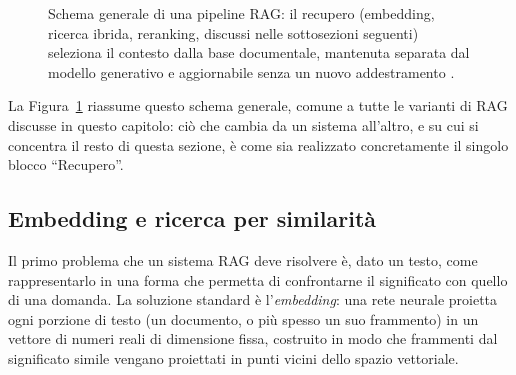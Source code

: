 \begin{figure}[htbp]
  \centering
  \caption{Schema generale di una pipeline RAG: il recupero (embedding, ricerca ibrida, reranking, discussi nelle
    sottosezioni seguenti) seleziona il contesto dalla base documentale, mantenuta separata dal modello generativo
    e aggiornabile senza un nuovo addestramento \cite{lewis2020retrieval}.}
  \label{fig:rag-pipeline}
\end{figure}

La Figura~\ref{fig:rag-pipeline} riassume questo schema generale, comune a tutte le varianti di RAG discusse in
questo capitolo: ciò che cambia da un sistema all'altro, e su cui si concentra il resto di questa sezione, è come
sia realizzato concretamente il singolo blocco ``Recupero''.

\subsection{Embedding e ricerca per similarità}

Il primo problema che un sistema RAG deve risolvere è, dato un testo, come rappresentarlo in una forma che permetta
di confrontarne il significato con quello di una domanda. La soluzione standard è l'\emph{embedding}: una rete neurale
proietta ogni porzione di testo (un documento, o più spesso un suo frammento) in un vettore di numeri reali di
dimensione fissa, costruito in modo che frammenti dal significato simile vengano proiettati in punti vicini dello
spazio vettoriale.


